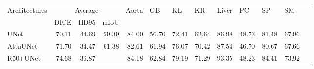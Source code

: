 \documentclass[10pt,twocolumn,letterpaper]{article}
\begin{document}
\begin{table*}[]
\begin{center}
    {\small{
\begin{tabular}{lrrrrrrrrrrrr}
\toprule
\multirow{2}{*}{Architectures} & \multicolumn{3}{c}{Average}                                                                                     & \multicolumn{1}{l}{\multirow{2}{*}{Aorta}} & \multicolumn{1}{l}{\multirow{2}{*}{GB}} & \multicolumn{1}{l}{\multirow{2}{*}{KL}} & \multicolumn{1}{l}{\multirow{2}{*}{KR}} & \multicolumn{1}{l}{\multirow{2}{*}{Liver}} & \multicolumn{1}{l}{\multirow{2}{*}{PC}} & \multicolumn{1}{l}{\multirow{2}{*}{SP}} & \multicolumn{1}{l}{\multirow{2}{*}{SM}} \\
                               & \multicolumn{1}{l}{DICE} & \multicolumn{1}{l}{HD95} & \multicolumn{1}{l}{mIoU} & \multicolumn{1}{l}{}                       & \multicolumn{1}{l}{}                    & \multicolumn{1}{l}{}                         & \multicolumn{1}{l}{}                         & \multicolumn{1}{l}{}                       & \multicolumn{1}{l}{}                    & \multicolumn{1}{l}{}                    & \multicolumn{1}{l}{}                    \\
\midrule
UNet \cite{ronneberger2015u}                   & 70.11                    & 44.69                    & 59.39                                        & 84.00                                      & 56.70                                   & 72.41                                        & 62.64                                        & 86.98                                      & 48.73                                   & 81.48                                   & 67.96                                   
\\
AttnUNet \cite{oktay2018attention}                   & 71.70                    & 34.47                    & 61.38                                   & 82.61                                      & 61.94                                   & 76.07                                        & 70.42                                        & 87.54                                      & 46.70                                   & 80.67                                   & 67.66                                   
\\
R50+UNet \cite{chen2021transunet}                   & 74.68                    & 36.87                    &                                      & 84.18                                      & 62.84                                   & 79.19                                        & 71.29                                        & 93.35                                      & 48.23                                   & 84.41                                   & 73.92                                   

\end{tabular}}}
\end{center}
\end{table*}
\end{document}
